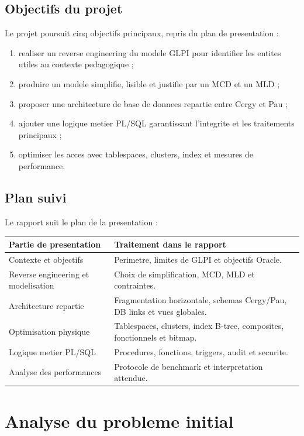 \documentclass[11pt,a4paper]{article}
\begin{document}
\subsection{Objectifs du projet}

Le projet poursuit cinq objectifs principaux, repris du plan de presentation :

\begin{enumerate}
  \item realiser un reverse engineering du modele GLPI pour identifier les
  entites utiles au contexte pedagogique ;
  \item produire un modele simplifie, lisible et justifie par un MCD et un MLD ;
  \item proposer une architecture de base de donnees repartie entre Cergy et Pau ;
  \item ajouter une logique metier PL/SQL garantissant l'integrite et les
  traitements principaux ;
  \item optimiser les acces avec tablespaces, clusters, index et mesures de
  performance.
\end{enumerate}

\subsection{Plan suivi}

Le rapport suit le plan de la presentation :

\begin{longtable}{p{4cm}p{10cm}}
\toprule
\textbf{Partie de presentation} & \textbf{Traitement dans le rapport} \\
\midrule
Contexte et objectifs & Perimetre, limites de GLPI et objectifs Oracle. \\
Reverse engineering et modelisation & Choix de simplification, MCD, MLD et contraintes. \\
Architecture repartie & Fragmentation horizontale, schemas Cergy/Pau, DB links et vues globales. \\
Optimisation physique & Tablespaces, clusters, index B-tree, composites, fonctionnels et bitmap. \\
Logique metier PL/SQL & Procedures, fonctions, triggers, audit et securite. \\
Analyse des performances & Protocole de benchmark et interpretation attendue. \\
\bottomrule
\end{longtable}

\section{Analyse du probleme initial}
\end{document}
